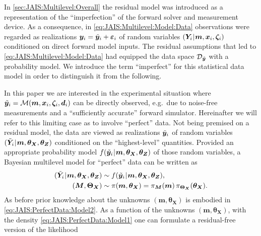 In \cref{sec:JAIS:Multilevel:Overall} the residual model was introduced as a representation of the ``imperfection'' of the forward solver and measurement device.
As a consequence, in \cref{eq:JAIS:Multilevel:Model:Data} observations were regarded as realizations \(\bm{y}_i = \tilde{\bm{y}}_i + \bm{\varepsilon}_i\)
of random variables \((\bm{Y}_i {\:\!}|{\:\!} \bm{m},\bm{x}_i,\bm{\zeta}_i)\) conditioned on direct forward model inputs.
The residual assumptions that led to \cref{eq:JAIS:Multilevel:Model:Data} had equipped the data space \(\mathcal{D}_{\tilde{\bm{y}}}\) with a probability model.
We introduce the term ``imperfect'' for this statistical data model in order to distinguish it from the following.
\par %
In this paper we are interested in the experimental situation where \(\tilde{\bm{y}}_i = \mathcal{M}(\bm{m},\bm{x}_i,\bm{\zeta}_i,\bm{d}_i)\) can be directly observed,
e.g.\ due to noise-free measurements and a ``sufficiently accurate'' forward simulator.
Hereinafter we will refer to this limiting case as to involve ``perfect'' data.
Not being premised on a residual model, the data are viewed as realizations \(\tilde{\bm{y}}_i\) of random variables
\((\tilde{\bm{Y}}_i {\:\!}|{\:\!} \bm{m},\bm{\theta}_{\bm{X}},\bm{\theta}_{\bm{Z}})\) conditioned on the ``highest-level'' quantities.
Provided an appropriate probability model \(f(\tilde{\bm{y}}_i {\:\!}|{\:\!} \bm{m},\bm{\theta}_{\bm{X}},\bm{\theta}_{\bm{Z}})\) of those random variables,
a Bayesian multilevel model for ``perfect'' data can be written as
\begin{subequations} \label{eq:JAIS:PerfectData:Model}
  \begin{align}
    (\tilde{\bm{Y}}_i {\:\!}|{\:\!} \bm{m},\bm{\theta}_{\bm{X}},\bm{\theta}_{\bm{Z}}) &\sim f(\tilde{\bm{y}}_i {\:\!}|{\:\!} \bm{m},\bm{\theta}_{\bm{X}},\bm{\theta}_{\bm{Z}}), \label{eq:JAIS:PerfectData:Model1} \\
    (\bm{M},\bm{\Theta}_{\bm{X}}) &\sim \pi(\bm{m},\bm{\theta}_{\bm{X}}) = \pi_{\bm{M}} (\bm{m}) \, \pi_{\bm{\Theta}_{\bm{X}}} (\bm{\theta}_{\bm{X}}). \label{eq:JAIS:PerfectData:Model2}
  \end{align}
\end{subequations}
As before prior knowledge about the unknowns \((\bm{m},\bm{\theta}_{\bm{X}})\) is embodied in \cref{eq:JAIS:PerfectData:Model2}.
As a function of the unknowns \((\bm{m},\bm{\theta}_{\bm{X}})\), with the density \cref{eq:JAIS:PerfectData:Model1} one can formulate a residual-free version of the likelihood
